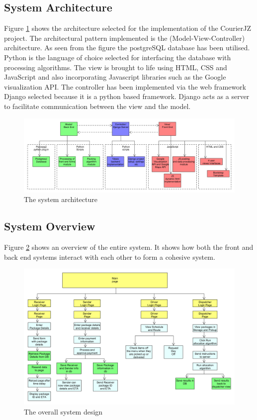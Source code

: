 \documentclass[paper=a4, fontsize=11pt]{scrartcl} %
\numberwithin{equation}{section} %
\numberwithin{figure}{section} %
\numberwithin{table}{section} %
\begin{document}
\subsection{System Architecture}
Figure \ref{Architecture} shows the architecture selected for the implementation of the CourierJZ project. The architectural pattern implemented is the (Model-View-Controller) architecture. As seen from the figure the postgreSQL database has been utilised. Python is the language of choice selected for interfacing the database with processing algorithms. The view is brought to life using HTML, CSS and JavaScript and also incorporating Javascript libraries such as the Google visualization API. The controller has been implemented via the web framework Django selected because it is a python based framework. Django acts as a server to facilitate communication between the view and the model.   
\begin{figure}[hbt!]
\centering
\includegraphics[width=5in]{pictures/system_architecture.png}
\caption{The system architecture}
\label{Architecture}
\end{figure}

\subsection{System Overview}
Figure \ref{SystemDesign} shows an overview of the entire system. It shows how both the front and back end systems interact with each other to form a cohesive system. 
\begin{figure}[hbt!]
\centering
\includegraphics[width=5in]{pictures/system_diagram.png}
\caption{The overall system design}
\label{SystemDesign}
\end{figure}
\end{document}
